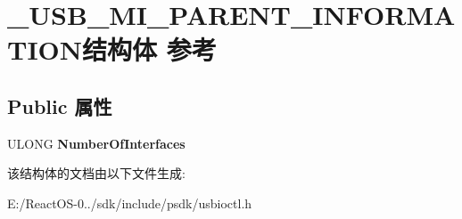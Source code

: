 \hypertarget{struct___u_s_b___m_i___p_a_r_e_n_t___i_n_f_o_r_m_a_t_i_o_n}{}\section{\+\_\+\+U\+S\+B\+\_\+\+M\+I\+\_\+\+P\+A\+R\+E\+N\+T\+\_\+\+I\+N\+F\+O\+R\+M\+A\+T\+I\+O\+N结构体 参考}
\label{struct___u_s_b___m_i___p_a_r_e_n_t___i_n_f_o_r_m_a_t_i_o_n}
\subsection*{Public 属性}
\begin{DoxyCompactItemize}
\item 
\mbox{\label{struct___u_s_b___m_i___p_a_r_e_n_t___i_n_f_o_r_m_a_t_i_o_n_ad8d4b3dad3047a5fc0fdfdac907bc8ec}} 
U\+L\+O\+NG {\bfseries Number\+Of\+Interfaces}
\end{DoxyCompactItemize}


该结构体的文档由以下文件生成\+:\begin{DoxyCompactItemize}
\item 
E\+:/\+React\+O\+S-\/0../sdk/include/psdk/usbioctl.\+h\end{DoxyCompactItemize}
